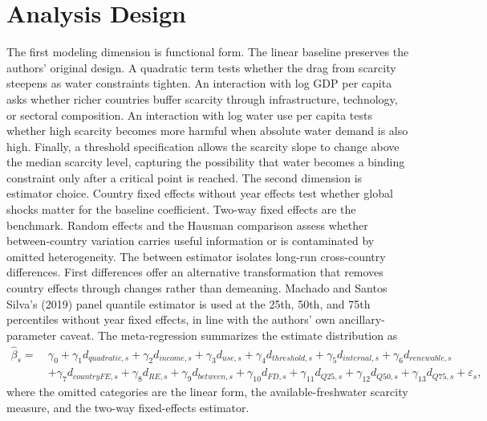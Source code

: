 \documentclass[11pt]{article}
\begin{document}
\section{Analysis Design}
The first modeling dimension is functional form. The linear baseline preserves the authors' original design. A quadratic term tests whether the drag from scarcity steepens as water constraints tighten. An interaction with log GDP per capita asks whether richer countries buffer scarcity through infrastructure, technology, or sectoral composition. An interaction with log water use per capita tests whether high scarcity becomes more harmful when absolute water demand is also high. Finally, a threshold specification allows the scarcity slope to change above the median scarcity level, capturing the possibility that water becomes a binding constraint only after a critical point is reached.
The second dimension is estimator choice. Country fixed effects without year effects test whether global shocks matter for the baseline coefficient. Two-way fixed effects are the benchmark. Random effects and the Hausman comparison assess whether between-country variation carries useful information or is contaminated by omitted heterogeneity. The between estimator isolates long-run cross-country differences. First differences offer an alternative transformation that removes country effects through changes rather than demeaning. Machado and Santos Silva's (2019) panel quantile estimator is used at the 25th, 50th, and 75th percentiles without year fixed effects, in line with the authors' own ancillary-parameter caveat.
The meta-regression summarizes the estimate distribution as
\[
\begin{aligned}
\hat{\beta}_s =\ & \gamma_0 + \gamma_1 d_{quadratic,s} + \gamma_2 d_{income,s} + \gamma_3 d_{use,s} + \gamma_4 d_{threshold,s} + \gamma_5 d_{internal,s} + \gamma_6 d_{renewable,s} \\
& + \gamma_7 d_{countryFE,s} + \gamma_8 d_{RE,s} + \gamma_9 d_{between,s} + \gamma_{10} d_{FD,s} + \gamma_{11} d_{Q25,s} + \gamma_{12} d_{Q50,s} + \gamma_{13} d_{Q75,s} + \varepsilon_s,
\end{aligned}
\]
where the omitted categories are the linear form, the available-freshwater scarcity measure, and the two-way fixed-effects estimator.
\end{document}
